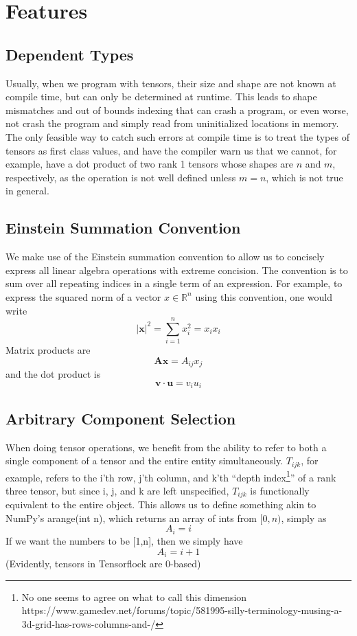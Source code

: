\documentclass[12pt]{article}
\begin{document}
\section{Features}
\subsection{Dependent Types}
Usually, when we program with tensors, their size and shape are not known at compile time, but can only be determined at runtime. This leads to shape mismatches and out of bounds indexing that can crash a program, or even worse, not crash the program and simply read from uninitialized locations in memory. The only feasible way to catch such errors at compile time is to treat the types of tensors as first class values, and have the compiler warn us that we cannot, for example, have a dot product of two rank 1 tensors whose shapes are $n$ and $m$, respectively, as the operation is not well defined unless $m=n$, which is not true in general.
\subsection{Einstein Summation Convention}
We make use of the Einstein summation convention to allow us to concisely
express all linear algebra operations with extreme concision. The convention
is to sum over all repeating indices in a single term of an expression. For
example, to express the squared norm of a vector $x \in \mathbb{R}^n$ using
this convention, one would write \[ |\mathbf{x} |^2 = \sum_{i=1}^{n} x_i^2
= x_i x_i\] Matrix products are \[\mathbf{Ax} = A_{ij}x_{j}\] and the dot
product is \[\mathbf{v} \cdot \mathbf{u} = v_i u_i\]
\subsection{Arbitrary Component Selection}
When doing tensor operations, we benefit from the ability to refer to both a single component 
of a tensor and the entire entity simultaneously. $T_{ijk}$, for example,
refers to the i'th row, j'th column,  and k'th ``depth index\footnote{No one
seems to agree on what to call this dimension
https://www.gamedev.net/forums/topic/581995-silly-terminology-musing-a-3d-grid-has-rows-columns-and-/}''
of a rank three tensor, but since i, j, and k are left unspecified, $T_{ijk}$
is functionally equivalent to the entire object. This allows us to define
something akin to NumPy's arange(int n), which returns an array of ints from $[0,n)$, simply as \[A_i = i\] If we want the numbers to be [1,n], then we simply have 
\[A_i = i+1\]
(Evidently, tensors in Tensorflock are 0-based)
\end{document}

